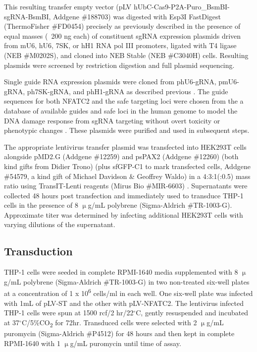 This resulting transfer empty vector (pLV hUbC-Cas9-P2A-Puro\_BsmBI-sgRNA-BsmBI, Addgene \#188703) was digested with Esp3I FastDigest (ThermoFisher \#FD0454) precisely as previously described \citep{Kabadi2014} in the presence of equal masses (~200 ng each) of constituent sgRNA expression plasmids driven from mU6, hU6, 7SK, or hH1 RNA pol III promoters, ligated with T4 ligase (NEB \#M0202S), and cloned into NEB Stable (NEB \#C3040H) cells. Resulting plasmids were screened by restriction digestion and full plasmid sequencing. 

Single guide RNA expression plasmids were cloned from phU6-gRNA, pmU6-gRNA, ph7SK-gRNA, and phH1-gRNA as described previous \citep{Kabadi2014}. The guide sequences for both NFATC2 and the safe targeting loci were chosen from the a database of available guides and safe loci in the human genome to model the DNA damage response from sgRNA targeting without overt toxicity or phenotypic changes \citep{Morgens2017}. These plasmids were purified and used in subsequent steps.

The appropriate lentivirus transfer plasmid was transfected into HEK293T cells alongside pMD2.G (Addgene \#12259) and psPAX2 (Addgene \#12260) (both kind gifts from Didier Trono) (plus sfGFP-C1 to mark transfected cells, Addgene \#54579, a kind gift of Michael Davidson \& Geoffrey Waldo) in a 4:3:1(:0.5) mass ratio using TransIT-Lenti reagents (Mirus Bio \#MIR-6603) \citep{Pedelacq2006}. Supernatants were collected 48 hours post transfection and immediately used to transduce THP-1 cells in the presence of 8 $\upmu$g/mL polybrene (Sigma-Aldrich \#TR-1003-G). Approximate titer was determined by infecting additional HEK293T cells with varying dilutions of the supernatant.

\subsection{Transduction}\label{transduction}

THP-1 cells were seeded in complete RPMI-1640 media supplemented with 8 $\upmu$g/mL polybrene (Sigma-Aldrich \#TR-1003-G) in two non-treated six-well plates at a concentration of 1 x 10\textsuperscript{6} cells/ml in each well. One six-well plate was infected with 1mL of pLV-ST and the other with pLV-NFATC2. The lentivirus infected THP-1 cells were spun at 1500 rcf/2 hr/22$^{\circ}$C, gently resuspended and incubated at 37$^{\circ}$C/5\%CO\textsubscript{2} for 72hr. Transduced cells were selected with 2 $\upmu$g/mL puromycin (Sigma-Aldrich \#P4512) for 48 hours and then kept in complete RPMI-1640 with 1 $\upmu$g/mL puromycin until time of assay.

